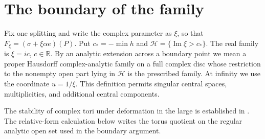 \section{The boundary of the family}

\begin{definition}\label{def:V:analytic-boundary-extension}

Fix one splitting and write the complex parameter as $\xi$, so that
$F_\xi=(\sigma+\xi\alpha e)(P)$. Put
$c_*=-\min h$ and $\mathcal H=\{\operatorname{Im}\xi>c_*\}$.
The real family is $\xi=ic$, $c\in\mathbb R$.
By an analytic extension across a boundary point we mean a proper
Hausdorff complex-analytic family on a full complex disc whose
restriction to the nonempty open part lying in $\mathcal H$ is
the prescribed family. At infinity we use the coordinate $u=1/\xi$.
This definition permits singular central spaces, multiplicities,
and additional central components.
\end{definition}

\begin{remark}\label{rem:V:tori-deformations-input}
The stability of complex tori under deformation in the large is
established in \cite[definition, p.~261; Theorem 2.1, p.~264]{Catanese2004}.
The relative-form calculation below writes the torus quotient
on the regular analytic open set used in the boundary argument.
\end{remark}

